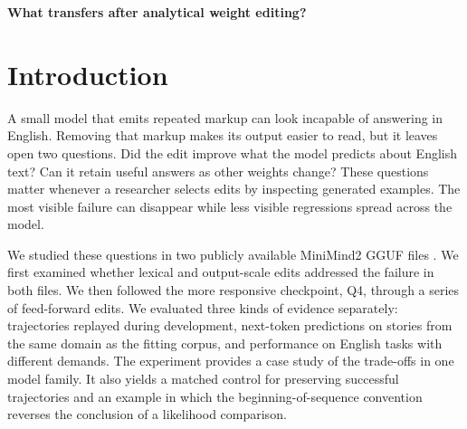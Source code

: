 \documentclass[11pt]{article}
\begin{document}
\begin{center}
{\LARGE\bfseries What transfers after analytical weight editing?\par}
\vspace{3pt}{\Large A language repair study in MiniMind2\par}
\end{center}
\begin{abstract}
Can direct changes to a small quantized language model correct repetitive answers and improve English beyond the prompts used to design the changes? We followed an editing sequence from token-row rescaling to constrained feed-forward updates and offline distillation. In MiniMind2 Q4, an early edit removed detectable word loops on 360 development presentations and raised exact copying from 0 to 47 of 72. Yet it assigned lower probability than the original to every one of 21,990 TinyStories validation stories. Subsequent analytical fits to narrative text reversed that loss. The final checkpoint reduced corpus perplexity from 24.52 to 11.98, reached 12/96 on familiar short-answer prompts and preserved every previously correct answer from its immediate predecessor on 392 development presentations. Changes outside those tests were small. Grammatical preferences on BLiMP rose from 59.19\% to 59.55\%, causal choices on COPA fell from 252/500 to 251/500, and post-freeze short answers improved from 4/40 to 5/40 relative to the preceding checkpoint. These results distinguish three outcomes of weight editing in this model: control of observable repetition, improved prediction within the calibration domain, and limited transfer to other English tasks.
\end{abstract}

\section{Introduction}
A small model that emits repeated markup can look incapable of answering in English. Removing that markup makes its output easier to read, but it leaves open two questions. Did the edit improve what the model predicts about English text? Can it retain useful answers as other weights change? These questions matter whenever a researcher selects edits by inspecting generated examples. The most visible failure can disappear while less visible regressions spread across the model.

We studied these questions in two publicly available MiniMind2 GGUF files \citep{minimind}. We first examined whether lexical and output-scale edits addressed the failure in both files. We then followed the more responsive checkpoint, Q4, through a series of feed-forward edits. We evaluated three kinds of evidence separately: trajectories replayed during development, next-token predictions on stories from the same domain as the fitting corpus, and performance on English tasks with different demands. The experiment provides a case study of the trade-offs in one model family. It also yields a matched control for preserving successful trajectories and an example in which the beginning-of-sequence convention reverses the conclusion of a likelihood comparison.
\end{document}
